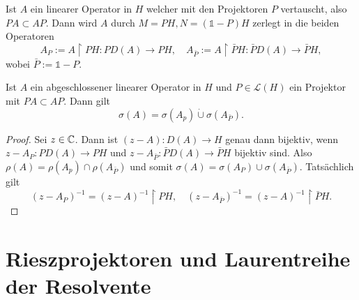 \documentclass{mycourse}
\begin{document}
Ist $A$ ein linearer Operator in $H$ welcher mit den Projektoren $P$ vertauscht, also $PA\subset AP$. Dann wird $A$ durch $M=PH, N=(\mathbb{1}-P)H$ zerlegt in die beiden Operatoren
\[
A_P:=A \upharpoonright PH: PD(A) \to PH, \quad A_{\bar{P}}:=A \upharpoonright \bar PH: \bar P D(A) \to \bar{P}H,
\] 
wobei $\bar P:=\mathbb{1}-P$.
\begin{lem}\label{1.4}
Ist $A$ ein abgeschlossener linearer Operator in $H$ und $P\in \mathcal L(H)$ ein Projektor mit $PA \subset AP$. Dann gilt 
\[
\sigma(A)=\sigma(A_p)\dot\cup \sigma(A_{\bar{P}}).
\]
\end{lem}
\begin{proof}
Sei $z\in \mathbb{C}$. Dann ist $(z-A):D(A) \to H$ genau dann bijektiv, wenn $z-A_P: PD(A)\to PH$ und $z-A_{\bar{P}}:\bar P D(A) \to \bar P H$ bijektiv sind. Also $\rho(A)=\rho(A_p) \cap \rho(A_{\bar P})$ und somit $\sigma(A)=\sigma(A_P) \cup \sigma(A_{\bar P})$. Tatsächlich gilt
\[
(z-A_P)^{-1}=(z-A)^{-1} \upharpoonright PH, \quad (z-A_{\bar P})^{-1} = (z-A)^{-1} \upharpoonright \bar PH.
\]
\end{proof}
\section{Rieszprojektoren und Laurentreihe der Resolvente}
\end{document}
